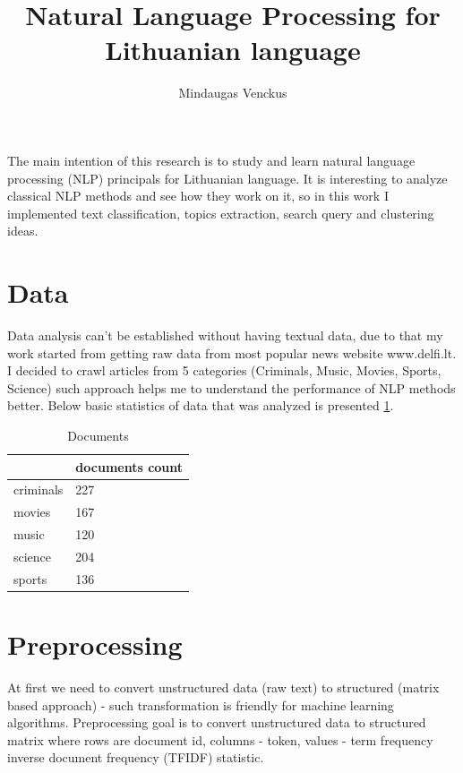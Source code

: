 \documentclass{article}
\begin{document}
\title{Natural Language Processing for Lithuanian language}
\author{Mindaugas Venckus}

\maketitle
The main intention of this research is to study and learn natural language processing (NLP) principals  for Lithuanian language. It is interesting to analyze classical NLP methods and see how they work on it, so in this work I implemented text classification, topics extraction, search query and clustering ideas.
\begin{abstract}

\end{abstract}

\section{Data}
Data analysis can't be established without having textual data, due to that my work started from getting raw data from most popular news website www.delfi.lt. I decided to crawl articles from 5 categories (Criminals, Music, Movies, Sports, Science) such approach helps me to understand the performance of NLP methods better. Below basic statistics of data that was analyzed is presented  \ref{DocumentsTable}.
\begin{table}[htb]
\centering
\caption{Documents}
\label{DocumentsTable}
\begin{tabular}{|l|l|}
\hline
          & documents count \\ \hline
criminals & 227             \\ \hline
movies    & 167             \\ \hline
music     & 120             \\ \hline
science   & 204             \\ \hline
sports    & 136             \\ \hline
\end{tabular}
\end{table}
\section{Preprocessing}
 
At first we need to convert unstructured data (raw text) to structured (matrix based approach) -  such transformation is friendly for machine learning algorithms. Preprocessing goal is to convert unstructured data to  structured matrix where rows are document id, columns - token, values - term frequency inverse document frequency (TFIDF) statistic.
\end{document}
